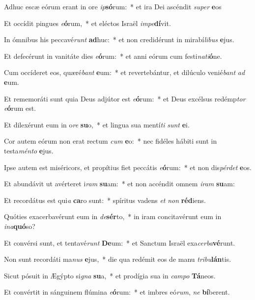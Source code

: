 \item Adhuc escæ eórum erant in ore \textit{ip}\textbf{só}rum:~* et ira Dei ascéndit \textit{su}\textit{per} \textbf{e}os
\item Et occídit pingues \textit{e}\textbf{ó}rum,~* et eléctos Israël \textit{im}\textit{pe}\textbf{dí}vit.
\item In ómnibus his peccavé\textit{runt} \textbf{ad}huc:~* et non credidérunt in mirabí\textit{li}\textit{bus} \textbf{e}jus.
\item Et defecérunt in vanitáte dies \textit{e}\textbf{ó}rum:~* et anni eórum cum festi\textit{na}\textit{ti}\textbf{ó}ne.
\item Cum occíderet eos, quæré\textit{bant} \textbf{e}um:~* et revertebántur, et dilúculo venié\textit{bant} \textit{ad} \textbf{e}um.
\item Et rememoráti sunt quia Deus adjútor est \textit{e}\textbf{ó}rum:~* et Deus excélsus redémp\textit{tor} \textit{e}\textbf{ó}rum est.
\item Et dilexérunt eum in o\textit{re} \textbf{su}o,~* et lingua sua mentí\textit{ti} \textit{sunt} \textbf{e}i.
\item Cor autem eórum non erat rectum \textit{cum} \textbf{e}o:~* nec fidéles hábiti sunt in testa\textit{mén}\textit{to} \textbf{e}jus.
\item Ipse autem est miséricors, et propítius fiet peccátis \textit{e}\textbf{ó}rum:~* et non dis\textit{pér}\textit{det} \textbf{e}os.
\item Et abundávit ut avérteret i\textit{ram} \textbf{su}am:~* et non accéndit omnem \textit{i}\textit{ram} \textbf{su}am:
\item Et recordátus est qui\textit{a} \textbf{ca}ro sunt:~* spíritus vadens \textit{et} \textit{non} \textbf{réd}iens.
\item Quóties exacerbavérunt eum in \textit{de}\textbf{sér}to,~* in iram concitavérunt eum in \textit{in}\textit{a}\textbf{quó}so?
\item Et convérsi sunt, et tentavé\textit{runt} \textbf{De}um:~* et Sanctum Israël exa\textit{cer}\textit{ba}\textbf{vé}runt.
\item Non sunt recordáti ma\textit{nus} \textbf{e}jus,~* die qua redémit eos de manu \textit{tri}\textit{bu}\textbf{lán}tis.
\item Sicut pósuit in Ægýpto si\textit{gna} \textbf{su}a,~* et prodígia sua in \textit{cam}\textit{po} \textbf{Tá}neos.
\item Et convértit in sánguinem flúmina \textit{e}\textbf{ó}rum:~* et imbres eó\textit{rum}, \textit{ne} \textbf{bí}berent.
